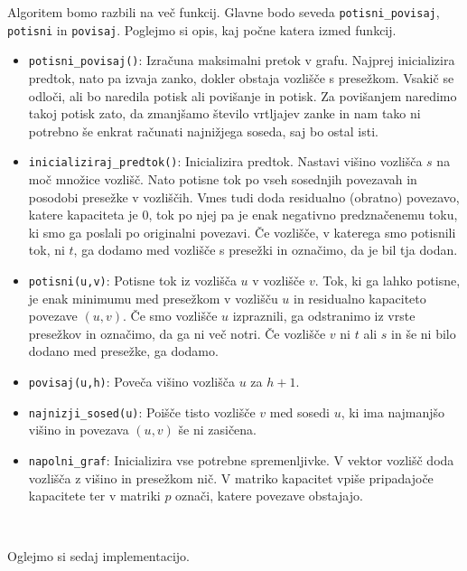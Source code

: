 \documentclass[mat1]{fmfdelo}
\begin{document}
Algoritem bomo razbili na več funkcij. Glavne bodo seveda \texttt{potisni\_povisaj}, \texttt{potisni} in \texttt{povisaj}. Poglejmo si opis, kaj počne katera izmed funkcij.

\begin{itemize}
\item \texttt{potisni\_povisaj()}: Izračuna maksimalni pretok v grafu. Najprej inicializira predtok, nato pa izvaja zanko, dokler obstaja vozlišče s presežkom. Vsakič se odloči, ali bo naredila potisk ali povišanje in potisk. Za povišanjem naredimo takoj potisk zato, da zmanjšamo število vrtljajev zanke in nam tako ni potrebno še enkrat računati najnižjega soseda, saj bo ostal isti.
\item \texttt{inicializiraj\_predtok()}: Inicializira predtok. Nastavi višino vozlišča $s$ na moč množice vozlišč. Nato potisne tok po vseh sosednjih povezavah in posodobi presežke v vozliščih. Vmes tudi doda residualno (obratno) povezavo, katere kapaciteta je $0$, tok po njej pa je enak negativno predznačenemu toku, ki smo ga poslali po originalni povezavi. Če vozlišče, v katerega smo potisnili tok, ni $t$, ga dodamo med vozlišče s presežki in označimo, da je bil tja dodan.
\item \texttt{potisni(u,v)}: Potisne tok iz vozlišča $u$ v vozlišče $v$. Tok, ki ga lahko potisne, je enak minimumu med presežkom v vozlišču $u$ in residualno kapaciteto povezave $(u,v)$. Če smo vozlišče $u$ izpraznili, ga odstranimo iz vrste presežkov in označimo, da ga ni več notri. Če vozlišče $v$ ni $t$ ali $s$ in še ni bilo dodano med presežke, ga dodamo.
\item \texttt{povisaj(u,h)}: Poveča višino vozlišča $u$ za $h+1$.
\item \texttt{najnizji\_sosed(u)}: Poišče tisto vozlišče $v$ med sosedi $u$, ki ima najmanjšo višino in povezava $(u,v)$ še ni zasičena.
\item \texttt{napolni\_graf}: Inicializira vse potrebne spremenljivke. V vektor vozlišč doda vozlišča z višino in presežkom nič. V matriko kapacitet vpiše pripadajoče kapacitete ter v matriki $p$ označi, katere povezave obstajajo.
\end{itemize}~

Oglejmo si sedaj implementacijo.
\end{document}
